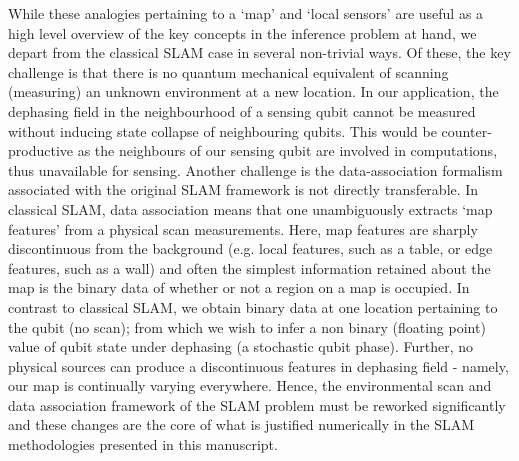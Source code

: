While these analogies pertaining to a `map' and `local sensors' are useful as a high level overview of the key concepts in the inference problem at hand, we depart from the classical SLAM case in several non-trivial ways. Of these, the key challenge is that there is no quantum mechanical equivalent of scanning (measuring) an unknown environment at a new location. In our application, the dephasing field in the neighbourhood of a sensing qubit cannot be measured  without inducing state collapse of neighbouring qubits. This would be counter-productive as the neighbours of our sensing qubit are involved in computations, thus unavailable for sensing. Another challenge is the data-association formalism associated with the original SLAM framework is not directly transferable. In classical SLAM, data association means that one unambiguously  extracts `map features' from a physical scan measurements. Here, map features are sharply discontinuous from the background (e.g. local features, such as a table, or edge features, such as a wall) and often the simplest information retained about the map is the binary data of whether or not a region on a map is occupied. In contrast to classical SLAM, we obtain binary data at one location pertaining to the qubit (no scan); from which we wish to infer a non binary (floating point) value of qubit state under dephasing (a stochastic qubit phase). Further, no physical sources can produce a discontinuous features in dephasing field - namely, our map is continually varying everywhere. Hence, the environmental scan and data association framework of the SLAM problem must be reworked significantly and these changes are the core of what is justified numerically in the SLAM methodologies presented in this manuscript. \\
\\

